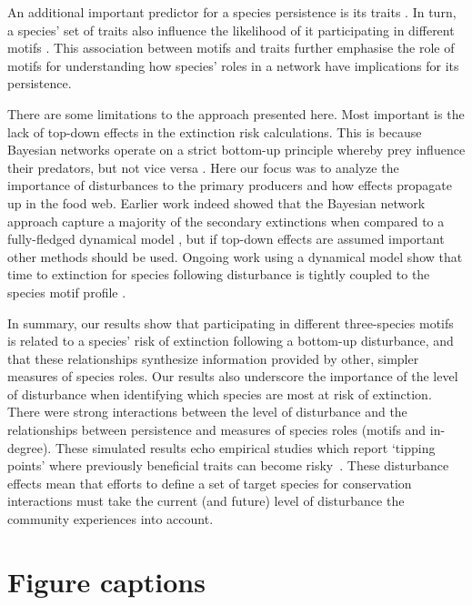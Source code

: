 \documentclass[12pt]{article}
\begin{document}
\begin{spacing}{2.0}
An additional important predictor for a species persistence is its traits \citep{Brose2017, curtsdotter2011robustness, Cardillo2005, Purvis2000}. In turn, a species' set of traits also influence the likelihood of it participating in different motifs \citep{cirtwill2018feeding}. This association between motifs and traits further emphasise the role of motifs for understanding how species' roles in a network have implications for its persistence. 

There are some limitations to the approach presented here. Most important is the lack of top-down effects in the extinction risk calculations. This is because Bayesian networks operate on a strict bottom-up principle whereby prey influence their predators, but not vice versa \citep{Eklof2013}. Here our focus was to analyze the importance of disturbances to the primary producers and how effects propagate up in the food web. Earlier work indeed showed that the Bayesian network approach capture a majority of the secondary extinctions when compared to a fully-fledged dynamical model \citep{Eklof2013}, but if top-down effects are assumed important other methods should be used. Ongoing work using a dynamical model show that time to extinction for species following disturbance is tightly coupled to the species motif profile \citep{Cirtwill2021_inprep}. 

In summary, our results show that participating in different three-species motifs is related to a species' risk of extinction following a bottom-up disturbance, and that these relationships synthesize information provided by other, simpler measures of species roles.
Our results also underscore the importance of the level of disturbance when identifying which species are most at risk of extinction.
There were strong interactions between the level of disturbance and the relationships between persistence and measures of species roles (motifs and in-degree).
These simulated results echo empirical studies which report `tipping points' where previously beneficial traits can become risky~\citep{}.
These disturbance effects mean that efforts to define a set of target species for conservation interactions must take the current (and future) level of disturbance the community experiences into account.


\clearpage    

\section*{Figure captions}


\end{spacing}
\end{document}
